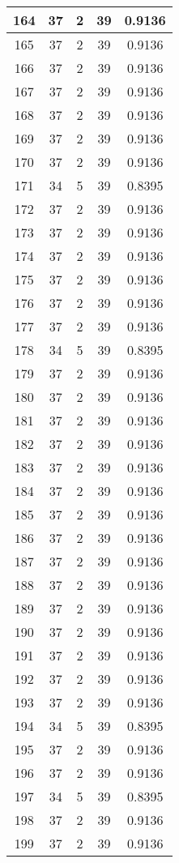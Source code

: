 \documentclass[letterpaper, 12pt]{article}
\begin{document}
\begin{longtable}{|c|c|c|c|c|}
\hline
164 & 37 & 2 & 39 & 0.9136 \\
\hline
165 & 37 & 2 & 39 & 0.9136 \\
\hline
166 & 37 & 2 & 39 & 0.9136 \\
\hline
167 & 37 & 2 & 39 & 0.9136 \\
\hline
168 & 37 & 2 & 39 & 0.9136 \\
\hline
169 & 37 & 2 & 39 & 0.9136 \\
\hline
170 & 37 & 2 & 39 & 0.9136 \\
\hline
171 & 34 & 5 & 39 & 0.8395 \\
\hline
172 & 37 & 2 & 39 & 0.9136 \\
\hline
173 & 37 & 2 & 39 & 0.9136 \\
\hline
174 & 37 & 2 & 39 & 0.9136 \\
\hline
175 & 37 & 2 & 39 & 0.9136 \\
\hline
176 & 37 & 2 & 39 & 0.9136 \\
\hline
177 & 37 & 2 & 39 & 0.9136 \\
\hline
178 & 34 & 5 & 39 & 0.8395 \\
\hline
179 & 37 & 2 & 39 & 0.9136 \\
\hline
180 & 37 & 2 & 39 & 0.9136 \\
\hline
181 & 37 & 2 & 39 & 0.9136 \\
\hline
182 & 37 & 2 & 39 & 0.9136 \\
\hline
183 & 37 & 2 & 39 & 0.9136 \\
\hline
184 & 37 & 2 & 39 & 0.9136 \\
\hline
185 & 37 & 2 & 39 & 0.9136 \\
\hline
186 & 37 & 2 & 39 & 0.9136 \\
\hline
187 & 37 & 2 & 39 & 0.9136 \\
\hline
188 & 37 & 2 & 39 & 0.9136 \\
\hline
189 & 37 & 2 & 39 & 0.9136 \\
\hline
190 & 37 & 2 & 39 & 0.9136 \\
\hline
191 & 37 & 2 & 39 & 0.9136 \\
\hline
192 & 37 & 2 & 39 & 0.9136 \\
\hline
193 & 37 & 2 & 39 & 0.9136 \\
\hline
194 & 34 & 5 & 39 & 0.8395 \\
\hline
195 & 37 & 2 & 39 & 0.9136 \\
\hline
196 & 37 & 2 & 39 & 0.9136 \\
\hline
197 & 34 & 5 & 39 & 0.8395 \\
\hline
198 & 37 & 2 & 39 & 0.9136 \\
\hline
199 & 37 & 2 & 39 & 0.9136 \\
\hline
\end{longtable}
\end{document}
